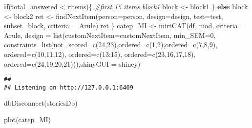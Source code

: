 \documentclass[
]{article}
\newenvironment{Shaded}{\begin{snugshade}}{\end{snugshade}}
\newcommand{\AttributeTok}[1]{\textcolor[rgb]{0.77,0.63,0.00}{#1}}
\newcommand{\CommentTok}[1]{\textcolor[rgb]{0.56,0.35,0.01}{\textit{#1}}}
\newcommand{\ControlFlowTok}[1]{\textcolor[rgb]{0.13,0.29,0.53}{\textbf{#1}}}
\newcommand{\DecValTok}[1]{\textcolor[rgb]{0.00,0.00,0.81}{#1}}
\newcommand{\FunctionTok}[1]{\textcolor[rgb]{0.00,0.00,0.00}{#1}}
\newcommand{\NormalTok}[1]{#1}
\newcommand{\OtherTok}[1]{\textcolor[rgb]{0.56,0.35,0.01}{#1}}
\newcommand{\SpecialCharTok}[1]{\textcolor[rgb]{0.00,0.00,0.00}{#1}}
\newcommand{\StringTok}[1]{\textcolor[rgb]{0.31,0.60,0.02}{#1}}
\begin{document}
\begin{Shaded}
\begin{Highlighting}[]
    
    \ControlFlowTok{if}\NormalTok{(total\_answered }\SpecialCharTok{\textless{}}\NormalTok{ ritems)\{ }\CommentTok{\#first 15 items block1}
\NormalTok{        block }\OtherTok{\textless{}{-}}\NormalTok{ block1}
\NormalTok{    \} }\ControlFlowTok{else}\NormalTok{     block }\OtherTok{\textless{}{-}}\NormalTok{ block2}
\NormalTok{    ret }\OtherTok{\textless{}{-}} \FunctionTok{findNextItem}\NormalTok{(}\AttributeTok{person=}\NormalTok{person, }\AttributeTok{design=}\NormalTok{design, }\AttributeTok{test=}\NormalTok{test, }
                        \AttributeTok{subset=}\NormalTok{block, }\AttributeTok{criteria =} \StringTok{\textquotesingle{}Arule\textquotesingle{}}\NormalTok{)}
\NormalTok{    ret}
\NormalTok{\}}
\NormalTok{catep\_MI }\OtherTok{\textless{}{-}} \FunctionTok{mirtCAT}\NormalTok{(df, mod, }\AttributeTok{criteria =} \StringTok{\textquotesingle{}Arule\textquotesingle{}}\NormalTok{, }
                    \AttributeTok{design =} \FunctionTok{list}\NormalTok{(}\AttributeTok{customNextItem=}\NormalTok{customNextItem, }\AttributeTok{min\_SEM=}\DecValTok{0}\NormalTok{,}
                                  \AttributeTok{constraints=}\FunctionTok{list}\NormalTok{(}\AttributeTok{not\_scored=}\FunctionTok{c}\NormalTok{(}\DecValTok{24}\NormalTok{,}\DecValTok{23}\NormalTok{),}\AttributeTok{ordered=}\FunctionTok{c}\NormalTok{(}\DecValTok{1}\NormalTok{,}\DecValTok{2}\NormalTok{),}\AttributeTok{ordered=}\FunctionTok{c}\NormalTok{(}\DecValTok{7}\NormalTok{,}\DecValTok{8}\NormalTok{,}\DecValTok{9}\NormalTok{), }\AttributeTok{ordered=}\FunctionTok{c}\NormalTok{(}\DecValTok{10}\NormalTok{,}\DecValTok{11}\NormalTok{,}\DecValTok{12}\NormalTok{), }\AttributeTok{ordered=}\FunctionTok{c}\NormalTok{(}\DecValTok{13}\SpecialCharTok{:}\DecValTok{15}\NormalTok{), }\AttributeTok{ordered=}\FunctionTok{c}\NormalTok{(}\DecValTok{23}\NormalTok{,}\DecValTok{16}\NormalTok{,}\DecValTok{17}\NormalTok{,}\DecValTok{18}\NormalTok{), }\AttributeTok{ordered=}\FunctionTok{c}\NormalTok{(}\DecValTok{24}\NormalTok{,}\DecValTok{19}\NormalTok{,}\DecValTok{20}\NormalTok{,}\DecValTok{21}\NormalTok{))),}\AttributeTok{shinyGUI =}\NormalTok{ shiney)}
\end{Highlighting}
\end{Shaded}

\begin{verbatim}
## 
## Listening on http://127.0.0.1:6409
\end{verbatim}

\begin{Shaded}
\begin{Highlighting}[]
\FunctionTok{dbDisconnect}\NormalTok{(storiesDb)}

\FunctionTok{plot}\NormalTok{(catep\_MI)}
\end{Highlighting}
\end{Shaded}
\end{document}

